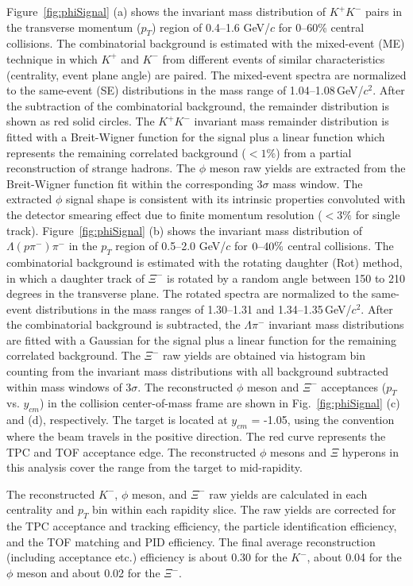 \documentclass[%
 reprint,	
showpacs,
 amsmath,amssymb,
 aps,
 superscriptaddress,
]{revtex4-1}
\begin{document}
Figure~\ref{fig:phiSignal} (a) shows the invariant mass distribution of $K^+K^-$ pairs in the transverse momentum ($p_{T}$) region of 0.4--1.6 GeV/$c$ for 0--60\% central collisions. The combinatorial background is estimated with the mixed-event (ME) technique in which $K^+$ and $K^-$ from different events of similar characteristics (centrality, event plane angle) are paired. The mixed-event spectra are normalized to the same-event (SE) distributions in the mass range of 1.04--1.08\,GeV/$c^2$. After the subtraction of the combinatorial background, the remainder distribution is shown as red solid circles. The $K^+K^-$ invariant mass remainder distribution is fitted with a Breit-Wigner function for the signal plus a linear function which represents the remaining correlated background ($< 1\%$) from a partial reconstruction of strange hadrons. The $\phi$ meson raw yields are extracted from the Breit-Wigner function fit within the corresponding 3$\sigma$ mass window. The extracted $\phi$ signal shape is consistent with its intrinsic properties convoluted with the detector smearing effect due to finite momentum resolution ($<3\%$ for single track).
Figure~\ref{fig:phiSignal} (b) shows the invariant mass distribution of $\Lambda(p\pi^-)\pi^-$ in the $p_{T}$ region of 0.5--2.0 GeV/$c$ for $\textup{0--40\%}$ central collisions. The combinatorial background is estimated with the rotating daughter (Rot) method, in which a daughter track of $\Xi^-$ is rotated by a random angle between 150 to 210 degrees in the transverse plane. The rotated spectra are normalized to the same-event distributions in the mass ranges of 1.30--1.31 and 1.34--1.35\,GeV/$c^2$. After the combinatorial background is subtracted, the $\Lambda\pi^-$ invariant mass distributions are fitted with a Gaussian for the signal plus a linear function for the remaining correlated background. The $\Xi^-$ raw yields are obtained via histogram bin counting from the invariant mass distributions with all background subtracted within mass windows of 3$\sigma$. The reconstructed $\phi$ meson and $\Xi^-$ acceptances ($p_T$ vs. $y_{cm}$) in the collision center-of-mass frame are shown in Fig.~\ref{fig:phiSignal} (c) and (d), respectively.
The target is located at $y_{cm}$ = -1.05, using the convention where the beam travels in the positive direction. The red curve represents the TPC and TOF acceptance edge. The reconstructed $\phi$ mesons and $\Xi$ hyperons in this analysis cover the range from the target to mid-rapidity.


The reconstructed $K^-$, $\phi$ meson, and $\Xi^-$ raw yields are calculated in each centrality and $p_{T}$ bin within each rapidity slice. 
The raw yields are corrected for the TPC acceptance and tracking efficiency, %
the particle identification efficiency, %
and the TOF matching and PID efficiency. The final average reconstruction (including acceptance etc.) efficiency is about 0.30 for the $K^-$, about 0.04 for the $\phi$ meson and about 0.02 for the $\Xi^-$.
\end{document}
